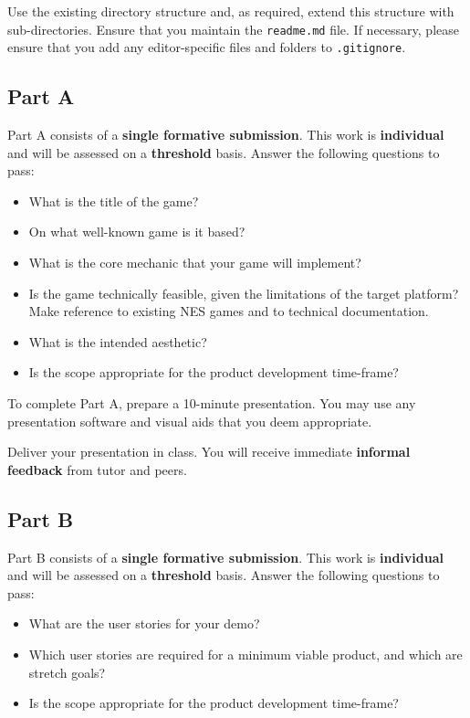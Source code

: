 \documentclass{../../fal_assignment}
\begin{document}
Use the existing directory structure and, as required, extend this structure with sub-directories.
Ensure that you maintain the \texttt{readme.md} file.
If necessary, please ensure that you add any editor-specific files and folders to \texttt{.gitignore}. 

\subsection*{Part A}

Part A consists of a \textbf{single formative submission}. This work is \textbf{individual} and will be assessed on a \textbf{threshold} basis. Answer the following questions to pass:

\begin{itemize}
	\item What is the title of the game?
	\item On what well-known game is it based?
	\item What is the core mechanic that your game will implement?
	\item Is the game technically feasible, given the limitations of the target platform?
		Make reference to existing NES games and to technical documentation.
	\item What is the intended aesthetic?
	\item Is the scope appropriate for the product development time-frame?
\end{itemize}

To complete Part A, prepare a 10-minute presentation.
You may use any presentation software and visual aids that you deem appropriate.

Deliver your presentation in class. You will receive immediate \textbf{informal feedback}
from tutor and peers.

\subsection*{Part B}

Part B consists of a \textbf{single formative submission}. This work is \textbf{individual} and will be assessed on a \textbf{threshold} basis. Answer the following questions to pass:

\begin{itemize}
	\item What are the user stories for your demo?
	\item Which user stories are required for a minimum viable product, and which are stretch goals?
	\item Is the scope appropriate for the product development time-frame?
\end{itemize}
\end{document}
